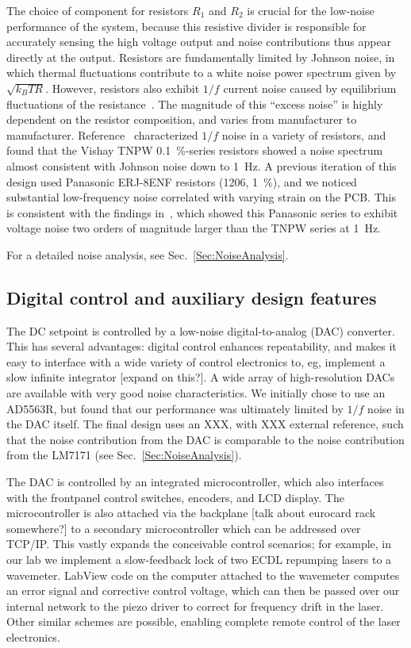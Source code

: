 \documentclass[aip,rsi,reprint]{revtex4-1} %
\begin{document}
The choice of component for resistors $R_1$ and $R_2$ is crucial for the low-noise performance of the system, because this resistive divider is responsible for accurately sensing the high voltage output and noise contributions thus appear directly at the output.
Resistors are fundamentally limited by Johnson noise, in which thermal fluctuations contribute to a white noise power spectrum given by $\sqrt{k_B T R}$.
However, resistors also exhibit $1/f$ current noise caused by equilibrium fluctuations of the resistance~\cite{Clarke1974a,Voss1976a}.
The magnitude of this ``excess noise'' is highly dependent on the resistor composition, and varies from manufacturer to manufacturer.
Reference~\cite{Seifert2009a} characterized $1/f$ noise in a variety of resistors, and found that the Vishay TNPW \SI{0.1}{\percent}-series resistors showed a noise spectrum almost consistent with Johnson noise down to \SI{1}{\hertz}.
A previous iteration of this design used Panasonic ERJ-8ENF resistors (1206, \SI{1}{\percent}), and we noticed substantial low-frequency noise correlated with varying strain on the PCB.
This is consistent with the findings in~\cite{Seifert2009a}, which showed this Panasonic series to exhibit voltage noise two orders of magnitude larger than the TNPW series at \SI{1}{\hertz}.

For a detailed noise analysis, see Sec.~\ref{Sec:NoiseAnalysis}.

\subsection{Digital control and auxiliary design features}
\label{Sec:DigControlAuxDesign}

The DC setpoint is controlled by a low-noise digital-to-analog (DAC) converter.
This has several advantages: digital control enhances repeatability, and makes it easy to interface with a wide variety of control electronics to, eg, implement a slow infinite integrator [expand on this?]. 
A wide array of high-resolution DACs are available with very good noise characteristics.
We initially chose to use an AD5563R, but found that our performance was ultimately limited by $1/f$ noise in the DAC itself.
The final design uses an XXX, with XXX external reference, such that the noise contribution from the DAC is comparable to the noise contribution from the LM7171 (see Sec.~\ref{Sec:NoiseAnalysis}).

The DAC is controlled by an integrated microcontroller, which also interfaces with the frontpanel control switches, encoders, and LCD display.
The microcontroller is also attached via the backplane [talk about eurocard rack somewhere?] to a secondary microcontroller which can be addressed over TCP/IP.
This vastly expands the conceivable control scenarios; for example, in our lab we implement a slow-feedback lock of two ECDL repumping lasers to a wavemeter. 
LabView code on the computer attached to the wavemeter computes an error signal and corrective control voltage, which can then be passed over our internal network to the piezo driver to correct for frequency drift in the laser.
Other similar schemes are possible, enabling complete remote control of the laser electronics.
\end{document}
